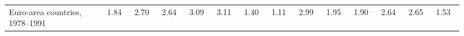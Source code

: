\begin{table}[!htbp]
\begin{threeparttable}
\begin{tabular}{@{}>{\raggedright\arraybackslash}p{0.18\linewidth}*{13}{>{\centering\arraybackslash}p{0.055\linewidth}}@{}}
Euro-area countries, 1978--1991 & \makecell[c]{\rule{0pt}{2.6ex} 1.84 \\ \rule{0pt}{2.0ex} \phantom{\textsuperscript{***}}} & \makecell[c]{\rule{0pt}{2.6ex} 2.70 \\ \rule{0pt}{2.0ex} \phantom{\textsuperscript{***}}} & \makecell[c]{\rule{0pt}{2.6ex} 2.64 \\ \rule{0pt}{2.0ex} \phantom{\textsuperscript{***}}} & \makecell[c]{\rule{0pt}{2.6ex} 3.09 \\ \rule{0pt}{2.0ex} \phantom{\textsuperscript{***}}} & \makecell[c]{\rule{0pt}{2.6ex} 3.11 \\ \rule{0pt}{2.0ex} \phantom{\textsuperscript{***}}} & \makecell[c]{\rule{0pt}{2.6ex} 1.40 \\ \rule{0pt}{2.0ex} \phantom{\textsuperscript{***}}} & \makecell[c]{\rule{0pt}{2.6ex} 1.11 \\ \rule{0pt}{2.0ex} \phantom{\textsuperscript{***}}} & \makecell[c]{\rule{0pt}{2.6ex} 2.99 \\ \rule{0pt}{2.0ex} \phantom{\textsuperscript{***}}} & \makecell[c]{\rule{0pt}{2.6ex} 1.95 \\ \rule{0pt}{2.0ex} \phantom{\textsuperscript{***}}} & \makecell[c]{\rule{0pt}{2.6ex} 1.90 \\ \rule{0pt}{2.0ex} \phantom{\textsuperscript{***}}} & \makecell[c]{\rule{0pt}{2.6ex} 2.64 \\ \rule{0pt}{2.0ex} \phantom{\textsuperscript{***}}} & \makecell[c]{\rule{0pt}{2.6ex} 2.65 \\ \rule{0pt}{2.0ex} \phantom{\textsuperscript{***}}} & \makecell[c]{\rule{0pt}{2.6ex} 1.53 \\ \rule{0pt}{2.0ex} \phantom{\textsuperscript{***}}} \\

\end{tabular}
\end{threeparttable}
\end{table}
